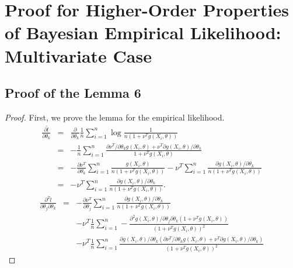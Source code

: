 \chapter{Proof for Higher-Order Properties of Bayesian Empirical Likelihood:
Multivariate Case}
\section{Proof of the Lemma 6}
\begin{proof}
First, we prove the lemma for the empirical likelihood.
	\begin{eqnarray*}
\frac{\partial\tilde{l}}{\partial\theta_{k}} & = & \frac{\partial}{\partial\theta_{k}}\frac{1}{n}\sum_{i=1}^{n}\log\frac{1}{n\left(1+\nu^{T}g\left(X_{i},\theta\right)\right)}\\
 & = & -\frac{1}{n}\sum_{i=1}^{n}\frac{{\partial\nu^{T}} / {\partial\theta_{k}}g\left(X_{i},\theta\right)+\nu^{T}{\partial g\left(X_{i},\theta\right)} / {\partial\theta_{k}}}{1+\nu^{T}g\left(X_{i},\theta\right)}\\
 & = & -\frac{\partial\nu^{T}}{\partial\theta_{k}}\sum_{i=1}^{n}\frac{g\left(X_{i},\theta\right)}{n\left(1+\nu^{T}g\left(X_{i},\theta\right)\right)}-\nu^{T}\sum_{i=1}^{n}\frac{{\partial g\left(X_{i},\theta\right)} / {\partial\theta_{k}}}{n\left(1+\nu^{T}g\left(X_{i},\theta\right)\right)}\\
 & = & -\nu^{T}\sum_{i=1}^{n}\frac{{\partial g\left(X_{i},\theta\right)} / {\partial\theta_{k}}}{n\left(1+\nu^{T}g\left(X_{i},\theta\right)\right)}.
\end{eqnarray*}
\begin{eqnarray*}
\frac{\partial^{2}\hat{l}}{\partial\theta_{j}\partial\theta_{k}} & = & -\frac{\partial\nu^{T}}{\partial\theta_{j}}\sum_{i=1}^{n}\frac{{\partial g\left(X_{i},\theta\right)} / {\partial\theta_{k}}}{n\left(1+\nu^{T}g\left(X_{i},\theta\right)\right)}\\
 &  & -\nu^{T}\frac{1}{n}\sum_{i=1}^{n}-\frac{{\partial^{2}g\left(X_{i},\theta\right)} / {\partial\theta_{j}\partial\theta_{k}}\left(1+\nu^{T}g\left(X_{i},\theta\right)\right) }{\left(1+\nu^{T}g\left(X_{i},\theta\right)\right)^{2}}\\
 & & -\nu^T \frac{1}{n}\sum_{i=1}^{n} \frac{{\partial g\left(X_{i},\theta\right)} / {\partial\theta_{k}}\left({\partial\nu^{T}} / {\partial\theta_{k}}g\left(X_{i},\theta\right)+\nu^{T}{\partial g\left(X_{i},\theta\right)} / {\partial\theta_{k}}\right)}{\left(1+\nu^{T}g\left(X_{i},\theta\right)\right)^{2}}
\end{eqnarray*}

\end{proof}
